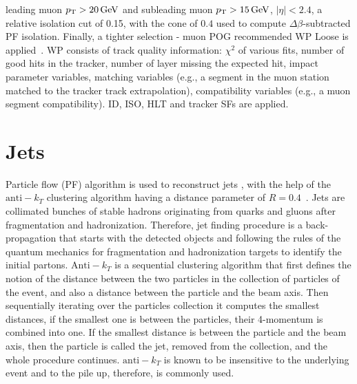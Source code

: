 \noindent leading muon $p_{\mathrm{T}}>20\,\text{Ge\hspace{-.08em}V}$ and subleading muon $p_{\mathrm{T}}>15\,\text{Ge\hspace{-.08em}V}$, $|\eta|<2.4$,
a relative
isolation cut of 0.15, with the cone of $0.4$ used to compute $\Delta\beta$-subtracted PF isolation.
Finally, a tighter selection - muon POG recommended WP Loose is applied~\cite{CMS-PAS-MUO-10-002,MuonsRun2}. WP consists of track quality information: $\chi^2$ of various fits, number of good hits in the tracker, number of layer missing the expected hit, impact parameter variables, matching variables (e.g., a segment in the muon station matched to the tracker track extrapolation), compatibility variables (e.g., a muon segment compatibility). ID, ISO, HLT and tracker SFs are applied.

\section{Jets\label{sec:jets}}
    Particle flow (PF) algorithm is used to reconstruct jets \cite{CMS-PAS-PFT-09-001,CMS-PAS-PFT-10-001}, with the help of the  $\text{anti}-k_T$ clustering algorithm having a distance parameter of $R=0.4$~\cite{Cacciari:2005hq,Cacciari:2008gp}. Jets are collimated bunches of 	stable hadrons originating from quarks and gluons after fragmentation and hadronization. Therefore, jet finding procedure is a back-propagation that starts with the detected objects and following the rules of the quantum mechanics for fragmentation and hadronization targets to identify the initial partons. $\text{Anti}-k_T$ is a sequential clustering algorithm that first defines the notion of the distance between the two particles in the collection of particles of the event, and also a distance between the particle and the beam axis. Then sequentially iterating over the particles collection it computes the smallest distances, if the smallest one is between the particles, their 4-momentum is combined into one. If the smallest distance is between the particle and the beam axis, then the particle is called the jet, removed from the collection, and the whole procedure continues. $\text{anti}-k_T$ is known to be insensitive to the underlying event and to the pile up, therefore, is commonly used. 
    

